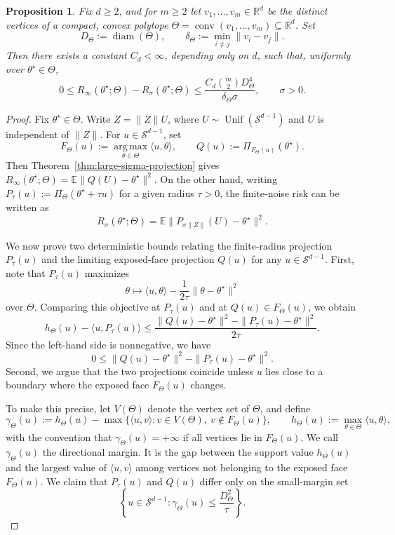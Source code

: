 \documentclass[11pt]{article}
\theoremstyle{plain}
\newtheorem{proposition}[theorem]{Proposition}
\theoremstyle{definition}
\providecommand{\mathbbm}{\mathbb} %
\newcommand{\R}{\mathbbm{R}}
\newcommand{\E}{\mathbb{E}}
\newcommand{\mcS}{\mathcal{S}}
\begin{document}
\begin{proposition}\label{prop:quant-diverging-noise-polytope}
Fix $d\ge2$, and for $m \ge 2$ let $v_1,\ldots,v_m\in\R^d$ be the distinct vertices of a compact, convex polytope $\Theta=\operatorname{conv}(v_1,\ldots,v_m)\subseteq\R^d$. Set
\[
    D_{\Theta}:=\operatorname{diam}(\Theta),
    \qquad
    \delta_\Theta:=\min_{i\neq j}\|v_i-v_j\|.
\]
Then there exists a constant $C_d<\infty$, depending only on $d$, such that, uniformly over $\theta^\star\in\Theta$,
\[
0
\le
R_\infty(\theta^\star;\Theta)-R_\sigma(\theta^\star;\Theta)
\le
\frac{
    C_d \binom{m}{2}D_\Theta^4
}{
    \delta_\Theta\sigma
},
\qquad \sigma>0.
\]
\end{proposition}

\begin{proof}
Fix $\theta^\star\in\Theta$. Write $Z=\|Z\|U$, where $U\sim\operatorname{Unif}(\mcS^{d-1})$ and $U$ is independent of $\|Z\|$. For $u\in\mcS^{d-1}$, set 
\[
F_\Theta(u) := \operatorname*{arg\,max}_{\theta\in\Theta} \langle u,\theta\rangle,
\qquad
Q(u):=\Pi_{F_\Theta(u)}(\theta^\star).
\] 
Then Theorem~\ref{thm:large-sigma-projection} gives $R_\infty(\theta^\star;\Theta)
=
\E\|Q(U)-\theta^\star\|^2$.
On the other hand, writing $P_\tau(u):=\Pi_\Theta(\theta^\star+\tau u)$ for a given radius $\tau>0$, the finite-noise risk can be written as 
\[
R_\sigma(\theta^\star;\Theta) 
= \E \bigl\| P_{\sigma\|Z\|}(U)-\theta^\star \bigr\|^2. 
\]

We now prove two deterministic bounds relating the finite-radius projection $P_\tau(u)$ and the limiting exposed-face projection $Q(u)$ for any $u \in \mcS^{d-1}$. 
First, note that $P_\tau(u)$ maximizes
\[
    \theta\mapsto
    \langle u,\theta\rangle
    -
    \frac{1}{2\tau}\|\theta-\theta^\star\|^2
\]
over $\Theta$. Comparing this objective at $P_\tau(u)$ and at
$Q(u)\in F_\Theta(u)$, we obtain
\[
    h_\Theta(u)-\langle u,P_\tau(u)\rangle
    \le
    \frac{
    \|Q(u)-\theta^\star\|^2
    -
    \|P_\tau(u)-\theta^\star\|^2
    }{2\tau}.
\]
Since the left-hand side is nonnegative, we have
\[
    0
    \le
    \|Q(u)-\theta^\star\|^2
    -
    \|P_\tau(u)-\theta^\star\|^2.
\]
Second, we argue that the two projections coincide unless $u$ lies close to a
boundary where the exposed face $F_\Theta(u)$ changes.

To make this precise, let $V(\Theta)$ denote the vertex set of $\Theta$, and define 
\[
\gamma_\Theta(u)
:=
h_\Theta(u)
-
\max\{ \langle u,v\rangle: v\in V(\Theta),\ v\notin F_\Theta(u) \},
\qquad
h_\Theta(u):=\max_{\theta\in\Theta}\langle u,\theta\rangle,
\] 
with the convention that $\gamma_\Theta(u)=+\infty$ if all vertices lie in $F_\Theta(u)$. We call $\gamma_\Theta(u)$ the directional margin. It is the gap between the support value $h_\Theta(u)$ and the largest value of
$\langle u,v\rangle$ among vertices not belonging to the exposed face
$F_\Theta(u)$. We claim that $P_\tau(u)$ and $Q(u)$ differ only on the small-margin set
\[
\left\{ u\in\mcS^{d-1}: \gamma_\Theta(u)\le \frac{D_{\Theta}^2}{\tau} \right\}. 
\]


\end{proof}
\end{document}

